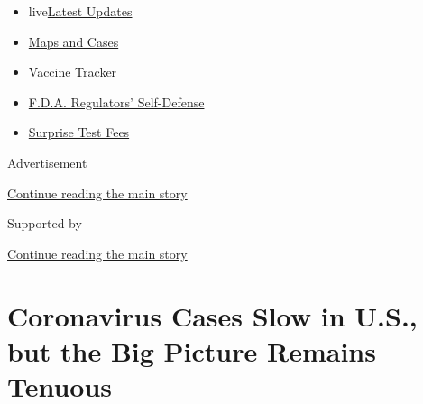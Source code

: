 \begin{itemize}
\tightlist
\item
  live\href{https://www.nytimes3xbfgragh.onion/2020/09/11/world/covid-19-coronavirus.html?name=styln-coronavirus-national\&region=TOP_BANNER\&block=storyline_menu_recirc\&action=click\&pgtype=Article\&impression_id=817df6d1-f4b7-11ea-bfcd-b5364c666c0c\&variant=undefined}{Latest
  Updates}
\item
  \href{https://www.nytimes3xbfgragh.onion/interactive/2020/us/coronavirus-us-cases.html?name=styln-coronavirus-national\&region=TOP_BANNER\&block=storyline_menu_recirc\&action=click\&pgtype=Article\&impression_id=817df6d2-f4b7-11ea-bfcd-b5364c666c0c\&variant=undefined}{Maps
  and Cases}
\item
  \href{https://www.nytimes3xbfgragh.onion/interactive/2020/science/coronavirus-vaccine-tracker.html?name=styln-coronavirus-national\&region=TOP_BANNER\&block=storyline_menu_recirc\&action=click\&pgtype=Article\&impression_id=817df6d3-f4b7-11ea-bfcd-b5364c666c0c\&variant=undefined}{Vaccine
  Tracker}
\item
  \href{https://www.nytimes3xbfgragh.onion/2020/09/10/us/politics/fda-coronavirus-vaccine.html?name=styln-coronavirus-national\&region=TOP_BANNER\&block=storyline_menu_recirc\&action=click\&pgtype=Article\&impression_id=817e1de0-f4b7-11ea-bfcd-b5364c666c0c\&variant=undefined}{F.D.A.
  Regulators' Self-Defense}
\item
  \href{https://www.nytimes3xbfgragh.onion/2020/09/09/upshot/coronavirus-surprise-test-fees.html?name=styln-coronavirus-national\&region=TOP_BANNER\&block=storyline_menu_recirc\&action=click\&pgtype=Article\&impression_id=817e1de1-f4b7-11ea-bfcd-b5364c666c0c\&variant=undefined}{Surprise
  Test Fees}
\end{itemize}

Advertisement

\protect\hyperlink{after-top}{Continue reading the main story}

Supported by

\protect\hyperlink{after-sponsor}{Continue reading the main story}

\hypertarget{coronavirus-cases-slow-in-us-but-the-big-picture-remains-tenuous}{%
\section{Coronavirus Cases Slow in U.S., but the Big Picture Remains
Tenuous}\label{coronavirus-cases-slow-in-us-but-the-big-picture-remains-tenuous}}

